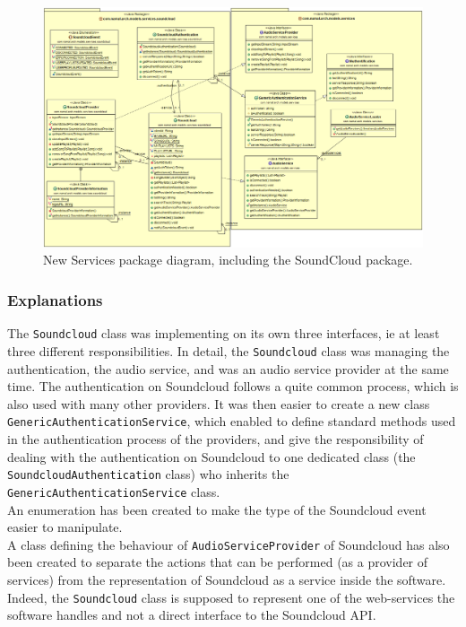 \documentclass{report}
\begin{document}
{{\begin{figure}[H]
  \includegraphics[scale=0.4]{class/Services2.png}
  \caption{New Services package diagram, including the SoundCloud package.}
  \label{UpdateServices}
\end{figure}
}

\subsubsection{Explanations}
The \texttt{Soundcloud} class was implementing on its own three interfaces, ie at least three different responsibilities. In detail, the \texttt{Soundcloud} class was managing the authentication, the audio service, and was an audio service provider at the same time. The authentication on Soundcloud follows a quite common process, which is also used with many other providers. It was then easier to create a new class \texttt{GenericAuthenticationService}, which enabled to define standard methods used in the authentication process of the providers, and give the responsibility of dealing with the authentication on Soundcloud to one dedicated class (the \texttt{SoundcloudAuthentication} class) who inherits the \texttt{GenericAuthenticationService} class. \\
An enumeration has been created to make the type of the Soundcloud event easier to manipulate.\\
A class defining the behaviour of \texttt{AudioServiceProvider} of Soundcloud has also been created to separate the actions that can be performed (as a provider of services) from  the representation of Soundcloud as a service inside the software. Indeed, the \texttt{Soundcloud} class is supposed to represent one of the web-services the software handles and not a direct interface to the Soundcloud API.

}
\end{document}
